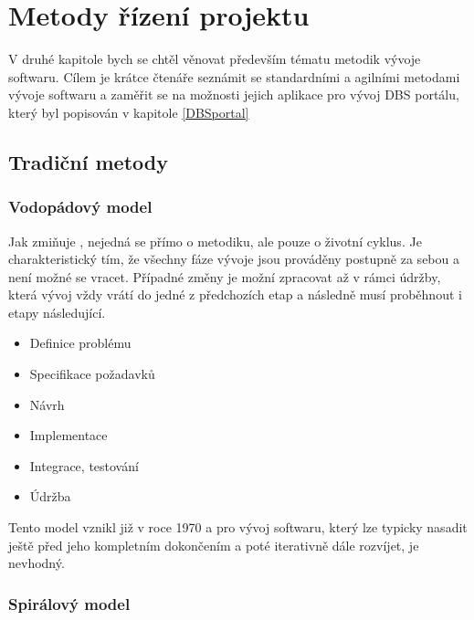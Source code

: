 \chapter{Metody řízení projektu} \label{methods}

V druhé kapitole bych se chtěl věnovat především tématu metodik vývoje softwaru. Cílem je krátce čtenáře seznámit se standardními a agilními metodami vývoje softwaru a zaměřit se na možnosti jejich aplikace pro vývoj DBS portálu, který byl popisován v kapitole \ref{DBSportal}



\section{Tradiční metody} \label{methods:traditional}

\subsection{Vodopádový model} \label{methods:waterfall}

Jak zmiňuje \cite{kadlec}, nejedná se přímo o metodiku, ale pouze o životní cyklus. Je charakteristický tím, že všechny fáze vývoje jsou prováděny postupně za sebou a není možné se vracet. Případné změny je možní zpracovat až v rámci údržby, která vývoj vždy vrátí do jedné z předchozích etap a následně musí proběhnout i etapy následující.

\begin{itemize}
	\item Definice problému
	\item Specifikace požadavků
	\item Návrh
	\item Implementace
	\item Integrace, testování
	\item Údržba
\end{itemize}

Tento model vznikl již v roce 1970 a pro vývoj softwaru, který lze typicky nasadit ještě před jeho kompletním dokončením a poté iterativně dále rozvíjet, je nevhodný.

\subsection{Spirálový model} \label{methods:spiral}

